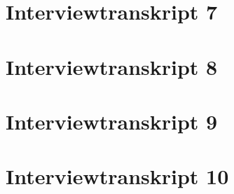 \section{Interviewtranskript 7}

\section{Interviewtranskript 8}

\section{Interviewtranskript 9}

\section{Interviewtranskript 10}



